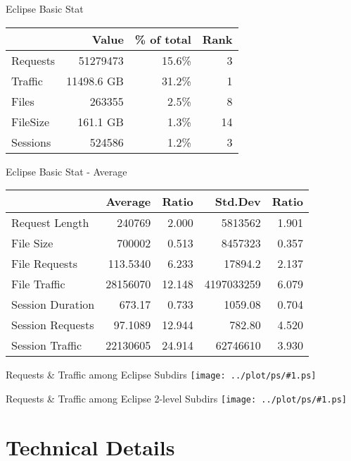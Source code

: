 \documentclass{beamer}
\newcommand\graph[1]{{\texttt{[image: ../plot/ps/\#1.ps]}}}
\begin{document}
\begin{frame}{Eclipse Basic Stat}
\begin{tabular}[t]{|l|r|r|r|}
\hline
 & Value & \% of total & Rank \\
\hline
Requests& 51279473 & 15.6\% & 3 \\
Traffic & 11498.6 GB & 31.2\% & 1 \\
Files 	& 263355 & 2.5\% & 8 \\
FileSize& 161.1 GB & 1.3\% & 14 \\
Sessions& 524586 & 1.2\% & 3 \\
\hline
\end{tabular}
\end{frame}

\begin{frame}{Eclipse Basic Stat - Average}
\begin{tabular}[t]{|l|r|r|r|r|}
\hline
 & Average & Ratio & Std.Dev & Ratio \\
\hline
Request Length	& 240769 & 2.000 & 5813562 & 1.901 \\
File Size	& 700002 & 0.513 & 8457323 & 0.357 \\
File Requests	& 113.5340 & 6.233 & 17894.2 & 2.137 \\
File Traffic	& 28156070 & 12.148 & 4197033259 & 6.079 \\
Session Duration& 673.17 & 0.733 & 1059.08 & 0.704 \\
Session Requests& 97.1089 & 12.944 & 782.80 & 4.520 \\
Session Traffic & 22130605 & 24.914 & 62746610 & 3.930 \\
\hline
\end{tabular}
\end{frame}

\begin{frame}{Requests \& Traffic among Eclipse Subdirs}
\graph{dist-subdir-eclipse}
\end{frame}

\begin{frame}{Requests \& Traffic among Eclipse 2-level Subdirs}
\graph{dist-subsubdir-eclipse}
\end{frame}

\section{Technical Details}
\end{document}
